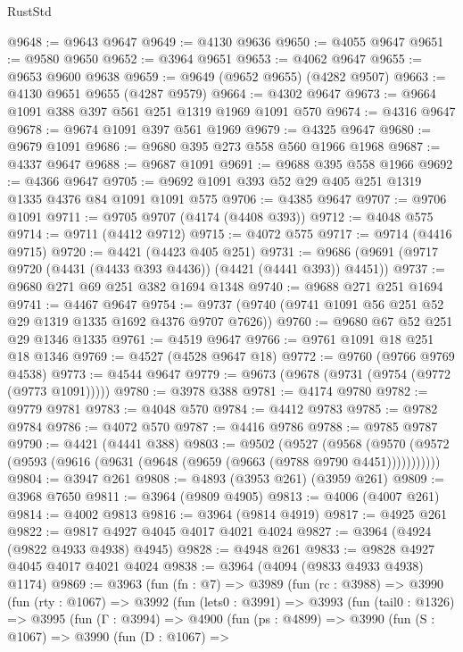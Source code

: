 \begin{lexlean}{RustStd}
\begin{coremodule}
{\begin{coremodule}
{{{{{{{{{{{{{{{{{{{{{{{{{{{{{{{{{{{{{{@9648 := @9643 @9647
@9649 := @4130 @9636
@9650 := @4055 @9647
@9651 := @9580 @9650
@9652 := @3964 @9651
@9653 := @4062 @9647
@9655 := @9653 @9600 @9638
@9659 := @9649 (@9652 @9655) (@4282 @9507)
@9663 := @4130 @9651 @9655 (@4287 @9579)
@9664 := @4302 @9647
@9673 := @9664 @1091 @388 @397 @561 @251 @1319 @1969 @1091 @570
@9674 := @4316 @9647
@9678 := @9674 @1091 @397 @561 @1969
@9679 := @4325 @9647
@9680 := @9679 @1091
@9686 := @9680 @395 @273 @558 @560 @1966 @1968
@9687 := @4337 @9647
@9688 := @9687 @1091
@9691 := @9688 @395 @558 @1966
@9692 := @4366 @9647
@9705 := @9692 @1091 @393 @52 @29 @405 @251 @1319 @1335 @4376 @84 @1091 @1091 @575
@9706 := @4385 @9647
@9707 := @9706 @1091
@9711 := @9705 @9707 (@4174 (@4408 @393))
@9712 := @4048 @575
@9714 := @9711 (@4412 @9712)
@9715 := @4072 @575
@9717 := @9714 (@4416 @9715)
@9720 := @4421 (@4423 @405 @251)
@9731 := @9686 (@9691 (@9717 @9720 (@4431 (@4433 @393 @4436)) (@4421 (@4441 @393)) @4451))
@9737 := @9680 @271 @69 @251 @382 @1694 @1348
@9740 := @9688 @271 @251 @1694
@9741 := @4467 @9647
@9754 := @9737 (@9740 (@9741 @1091 @56 @251 @52 @29 @1319 @1335 @1692 @4376 @9707 @7626))
@9760 := @9680 @67 @52 @251 @29 @1346 @1335
@9761 := @4519 @9647
@9766 := @9761 @1091 @18 @251 @18 @1346
@9769 := @4527 (@4528 @9647 @18)
@9772 := @9760 (@9766 @9769 @4538)
@9773 := @4544 @9647
@9779 := @9673 (@9678 (@9731 (@9754 (@9772 (@9773 @1091)))))
@9780 := @3978 @388
@9781 := @4174 @9780
@9782 := @9779 @9781
@9783 := @4048 @570
@9784 := @4412 @9783
@9785 := @9782 @9784
@9786 := @4072 @570
@9787 := @4416 @9786
@9788 := @9785 @9787
@9790 := @4421 (@4441 @388)
@9803 := @9502
    (@9527
      (@9568 (@9570 (@9572 (@9593 (@9616 (@9631 (@9648 (@9659 (@9663 (@9788 @9790 @4451)))))))))))
@9804 := @3947 @261
@9808 := @4893 (@3953 @261) (@3959 @261)
@9809 := @3968 @7650
@9811 := @3964 (@9809 @4905)
@9813 := @4006 (@4007 @261)
@9814 := @4002 @9813
@9816 := @3964 (@9814 @4919)
@9817 := @4925 @261
@9822 := @9817 @4927 @4045 @4017 @4021 @4024
@9827 := @3964 (@4924 (@9822 @4933 @4938) @4945)
@9828 := @4948 @261
@9833 := @9828 @4927 @4045 @4017 @4021 @4024
@9838 := @3964 (@4094 (@9833 @4933 @4938) @1174)
@9869 := @3963
    (fun (fn : @7) =>
    @3989
      (fun (rc : @3988) =>
      @3990
        (fun (rty : @1067) =>
        @3992
          (fun (lets0 : @3991) =>
          @3993
            (fun (tail0 : @1326) =>
            @3995
              (fun (Γ : @3994) =>
              @4900
                (fun (ps : @4899) =>
                @3990
                  (fun (S : @1067) =>
                  @3990
                    (fun (D : @1067) =>
}}}}}}}}}}}}}}}}}}}}}}}}}}}}}}}}}}}}}}
\end{coremodule}}
\end{coremodule}
\end{lexlean}
